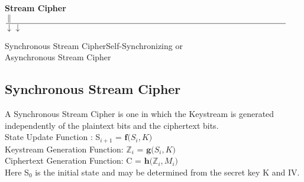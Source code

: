 \documentclass[11pt]{article}
\begin{document}
\newpage
\begin{center}
     \textbf{Stream Cipher}\\\vspace{-0.1cm}
     $\|$\\\vspace{-0.3cm}$\line(1,0){340}$\\\vspace{-0.1cm}$\downarrow$\hspace{11.8cm}$\downarrow$
  \end{center} \vspace{-1cm}
  \begin{flushleft}
\hspace{1cm}Synchronous Stream Cipher\hspace{6.5cm}Self-Synchronizing or \\ \hspace{11.5cm}Asynchronous Stream Cipher\\ 
  \end{flushleft}
 \subsection*{Synchronous Stream Cipher}
  \begin{flushleft}
      A Synchronous Stream Cipher is one in which the Keystream is generated independently of the plaintext bits and the ciphertext bits.\\
      \hspace{1cm} State Update Function : S$_{i+1}$ = $\mathbf{f}\big(S_i, K\big)$\\
      \hspace{1cm} Keystream Generation Function: $\mathbb{Z}_i$ = $\mathbf{g}\big(S_i, K\big)$\\
      \hspace{1cm} Ciphertext Generation Function: C = $\mathbf{h}\big(\mathbb{Z}_i, M_i\big)$\\
    Here S$_0$ is the initial state and may be determined from the secret key K and IV.
  \end{flushleft}
\end{document}
